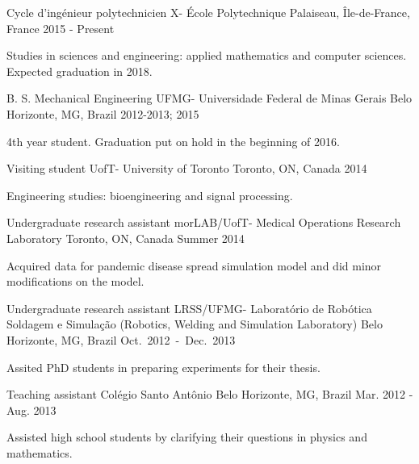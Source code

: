 \documentclass[11pt, a4paper]{awesome-cv}
\begin{document}
\makecvheader
%
%
\begin{cventries}
	\cventry
	{Cycle d'ingénieur polytechnicien}
	{X- École Polytechnique}
	{Palaiseau, Île-de-France, France}
	{2015 - Present}
	{
		\begin{cvitems}
			\item{Studies in sciences and engineering: applied mathematics and computer sciences. Expected graduation in 2018.}
		\end{cvitems}
	}
	\cventry
	{B. S. Mechanical Engineering}
	{UFMG- Universidade Federal de Minas Gerais}
	{Belo Horizonte, MG, Brazil}
	{2012-2013; 2015}
	{
		\begin{cvitems}
			\item {4th year student. Graduation put on hold in the beginning of 2016.}
		\end{cvitems}
	}
	\cventry
	{Visiting student}
	{UofT- University of Toronto}
	{Toronto, ON, Canada}
	{2014}
	{
		\begin{cvitems}
			\item{Engineering studies: bioengineering and signal processing.}
		\end{cvitems}
	}
\end{cventries}
%
\begin{cventries}
	\cventry
	{Undergraduate research assistant}
	{morLAB/UofT- Medical Operations Research Laboratory}
	{Toronto, ON, Canada}
	{Summer 2014}
	{
		\begin{cvitems}
			\item {Acquired data for pandemic disease spread simulation model and did minor modifications on the model.}
		\end{cvitems}
	}
	\cventry
	{Undergraduate research assistant}
	{LRSS/UFMG- Laboratório de Robótica Soldagem e Simulação (Robotics,	Welding and Simulation Laboratory)}
	{Belo Horizonte, MG, Brazil \mbox{Oct. 2012 - Dec. 2013}}
	{}
	{
		\begin{cvitems}
			\item {Assited PhD students in preparing experiments for their thesis.}
		\end{cvitems}
	}
	\cventry
	{Teaching assistant}
	{Colégio Santo Antônio}
	{Belo Horizonte, MG, Brazil}
	{Mar. 2012 - Aug. 2013}
	{
		\begin{cvitems}
			\item {Assisted high school students by clarifying their questions in physics and mathematics.}
		\end{cvitems}
	}
\end{cventries}
\end{document}

